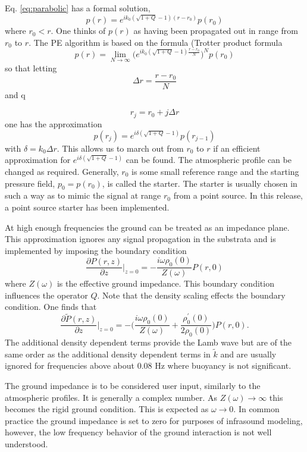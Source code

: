 Eq. \ref{eq:parabolic} has a formal solution, 
\[
p(r)=e^{ik_0(\sqrt{1+Q}-1)(r-r_0)} p(r_0)
\]
where $r_0<r$. One thinks of $p(r)$ as having been propagated out in range from $r_0$ to $r$. The PE algorithm is based on the formula (Trotter product formula \cite{stoer2013introduction} 
\begin{equation}\label{eq:trotter_prod}
p(r)=\lim_{N\rightarrow\infty}\Big(e^{ik_0(\sqrt{1+Q}-1)\frac{r-r_0}{N}}\Big)^N p(r_0)
\end{equation}
so that letting 
\[
\Delta r=\frac{r-r_0}{N}
\]
and q

\[
r_j=r_0+j\Delta r
\]
one has the approximation 
\begin{equation}\label{eq:split_step}
p(r_j)=e^{i\delta(\sqrt{1+Q}-1)}p(r_{j-1})
\end{equation}
with $\delta=k_0\Delta r$. This allows us to march out from $r_0$ to $r$ if an efficient approximation for $e^{i\delta(\sqrt{1+Q}-1)}$ can be found. The atmospheric profile can be changed as required. Generally, $r_0$ is some small reference range and the starting pressure field, $p_0=p(r_0)$, is called the starter. The starter is usually chosen in such a way as to mimic the signal at range $r_0$ from a point source. In this release, a point source starter has been implemented. 

At high enough frequencies the ground can be treated as an impedance plane. This approximation ignores any signal propagation in the substrata and is implemented by imposing the boundary condition 
\begin{equation}\label{eq:impedance}
\frac{\partial P(r,z)}{\partial z}\big|_{z=0}=-\frac{i\omega\rho_0(0)}{Z(\omega)}P(r,0)
\end{equation}
where $Z(\omega)$ is the effective ground impedance. This boundary condition influences the operator $Q$. Note that the density scaling effects the boundary condition. One finds that 
\[
\frac{\partial \tilde P(r,z)}{\partial z}\big|_{z=0}
=
-\Big(\frac{i\omega\rho_0(0)}{Z(\omega)}+\frac{\rho_0^\prime(0)}{2\rho_0(0)}\Big)P(r,0).
\]
The additional density dependent terms provide the Lamb wave but are of the same order as the additional density dependent terms in $\tilde k$ and are usually ignored for frequencies above about 0.08 Hz where buoyancy is not significant. 

The ground impedance is to be considered user input, similarly to the atmospheric profiles. It is generally a complex number. As $Z(\omega)\rightarrow \infty$ this becomes the rigid ground condition. This is expected as $\omega\rightarrow 0$. In common practice the ground impedance is set to zero for purposes of infrasound modeling, however, the low frequency behavior of the ground interaction is not well understood. 

